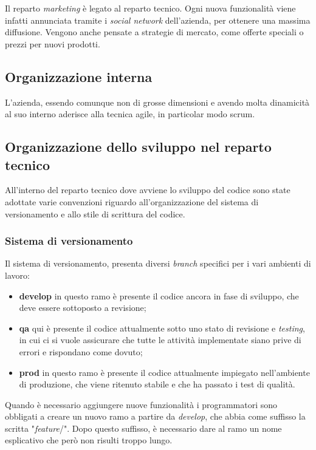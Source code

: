 Il reparto \textit{marketing} è legato al reparto tecnico. Ogni nuova
funzionalità viene infatti annunciata tramite i \textit{social network}
dell'azienda, per ottenere una massima diffusione. Vengono anche pensate a
strategie di mercato, come offerte speciali o prezzi per nuovi prodotti.

\subsection{Organizzazione interna}

L'azienda, essendo comunque non di grosse dimensioni e avendo molta dinamicità
al suo interno aderisce alla tecnica \gls{agile}, in particolar modo
\gls{scrum}.

\subsection{Organizzazione dello sviluppo nel reparto tecnico}
\label{intro:OrganizzazioneSviluppoRepartoTecnico}

All'interno del reparto tecnico dove avviene lo sviluppo del codice sono state
adottate varie convenzioni riguardo all'organizzazione del sistema di
versionamento e allo stile di scrittura del codice.

\subsubsection{Sistema di versionamento}

Il sistema di versionamento, presenta diversi \textit{branch} specifici per i
vari ambienti di lavoro:
\begin{itemize}

\item \textbf{develop} in questo ramo è presente il codice ancora in fase di
sviluppo, che deve essere sottoposto a revisione;
\item \textbf{qa} qui è presente il codice attualmente sotto uno stato di
revisione e \textit{testing}, in cui ci si vuole assicurare che tutte le
attività implementate siano prive di errori e rispondano come dovuto;
\item \textbf{prod} in questo ramo è presente il codice attualmente impiegato
nell'ambiente di produzione, che viene ritenuto stabile e che ha passato i test
di qualità.
\end{itemize}

Quando è necessario aggiungere nuove funzionalità i programmatori sono
obbligati a creare un nuovo ramo a partire da \textit{develop}, che abbia come
suffisso la scritta "\textit{feature}/". Dopo questo suffisso, è necessario dare
al ramo un nome esplicativo che però non risulti troppo lungo.

